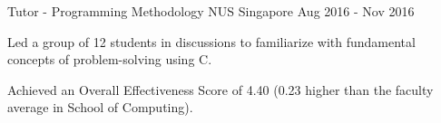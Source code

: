 \begin{cventries}

  \cventry
    {Tutor - Programming Methodology} %
    {NUS} %
    {Singapore} %
    {Aug 2016 - Nov 2016} %
    {
      \begin{cvitems} %
        \item {Led a group of 12 students in discussions to familiarize with fundamental concepts of problem-solving using C.}
        \item {Achieved an Overall Effectiveness Score of 4.40 (0.23 higher than the faculty average in School of Computing).}
      \end{cvitems}
    }

\end{cventries}
